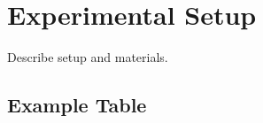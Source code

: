 \section{Experimental Setup}
Describe setup and materials.\cite{jauslinBoseEinsteinCondensation2025}

\subsection{Example Table}
